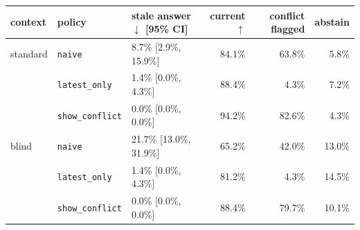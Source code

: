 \begin{tabular}{lllrrr}
\toprule
context & policy & stale answer$\downarrow$ [95\% CI] & current$\uparrow$ & conflict flagged & abstain \\
\midrule
standard & \texttt{naive} & 8.7\% [2.9\%, 15.9\%] & 84.1\% & 63.8\% & 5.8\% \\
 & \texttt{latest\_only} & 1.4\% [0.0\%, 4.3\%] & 88.4\% & 4.3\% & 7.2\% \\
 & \texttt{show\_conflict} & 0.0\% [0.0\%, 0.0\%] & 94.2\% & 82.6\% & 4.3\% \\
\midrule
blind & \texttt{naive} & 21.7\% [13.0\%, 31.9\%] & 65.2\% & 42.0\% & 13.0\% \\
 & \texttt{latest\_only} & 1.4\% [0.0\%, 4.3\%] & 81.2\% & 4.3\% & 14.5\% \\
 & \texttt{show\_conflict} & 0.0\% [0.0\%, 0.0\%] & 88.4\% & 79.7\% & 10.1\% \\
\bottomrule
\end{tabular}
